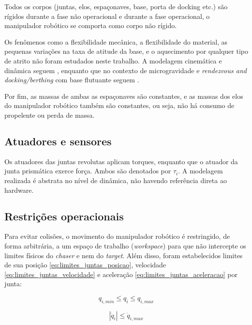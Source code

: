 Todos os corpos (juntas, elos, espaçonaves, base, porta de docking etc.) são rígidos durante a fase não operacional e durante a fase operacional, o manipulador robótico se comporta como corpo não rígido.

Os fenômenos como a flexibilidade mecânica, a flexibilidade do material, as pequenas variações na taxa de atitude da base, e o aquecimento por qualquer tipo de atrito não foram estudados neste trabalho.
A modelagem cinemática e dinâmica seguem \cite{craig2005}, enquanto que no contexto de microgravidade e \emph{rendezvous and docking/berthing} com base flutuante seguem \cite{fehse2003,wie2008space}.

Por fim, as massas de ambas as espaçonaves são constantes, e as massas dos elos do manipulador robótico também são constantes, ou seja, não há consumo de propelente ou perda de massa.

\subsection{Atuadores e sensores}
Os atuadores das juntas revolutas aplicam torques, enquanto que o atuador da junta prismática exerce força.
Ambos são denotados por $\tau_i$.
A modelagem realizada é abstrata no nível de dinâmica, não havendo referência direta ao hardware.

\subsection{Restrições operacionais}
Para evitar colisões, o movimento do manipulador robótico é restringido, de forma arbitrária, a um espaço de trabalho (\emph{workspace}) para que não intercepte os limites físicos do \emph{chaser} e nem do \emph{target}. Além disso, foram estabelecidos limites de sua posição \eqref{eq:limites_juntas_posicao}, velocidade \eqref{eq:limites_juntas_velocidade} e aceleração \eqref{eq:limites_juntas_aceleracao} por junta:

\begin{equation}
    \label{eq:limites_juntas_posicao}
    q_{i,min} \le q_i \le q_{i,max}
\end{equation}

\begin{equation}
    \label{eq:limites_juntas_velocidade}
|\dot q_i| \le \dot q_{i,max}
\end{equation}

